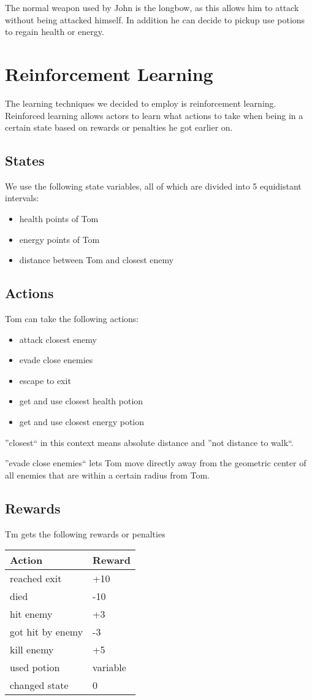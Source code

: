 \documentclass[a4paper,10pt]{scrartcl}
\begin{document}
The normal weapon used by John is the longbow, as this allows him to attack without being attacked himself. In addition he can decide to pickup use potions to regain health or energy.

\section{Reinforcement Learning}\label{sec:rl}
The learning techniques we decided to employ is reinforcement learning. Reinforced learning allows actors to learn what actions to take when being in a certain state based on rewards or penalties he got earlier on.


\subsection{States}
We use the following state variables, all of which are divided into 5 equidistant intervals:
\begin{itemize}
 \item health points of Tom %
 \item energy points of Tom
 \item distance between Tom and closest enemy
\end{itemize}

\subsection{Actions}
Tom can take the following actions:
\begin{itemize}
 \item attack closest enemy
 \item evade close enemies
 \item escape to exit
 \item get and use closest health potion
 \item get and use closest energy potion
\end{itemize}

''closest`` in this context means absolute distance and ''not distance to walk``.

''evade close enemies`` lets Tom move directly away from the geometric center of all enemies that are within a certain radius from Tom.

\subsection{Rewards}
Tm gets the following rewards or penalties
\begin{center}
\begin{tabular}{l|l}
Action & Reward \\
\hline
reached exit & +10 \\
died & -10 \\
hit enemy & +3 \\
got hit by enemy & -3 \\
kill enemy & +5 \\
used potion & variable\\
changed state & 0
\end{tabular}
\end{center}
\end{document}
